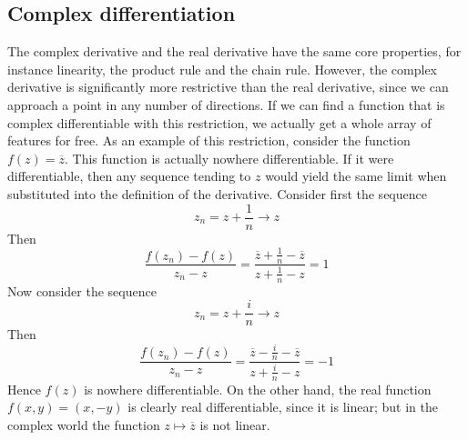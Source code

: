 \subsection{Complex differentiation}
The complex derivative and the real derivative have the same core properties, for instance linearity, the product rule and the chain rule.
However, the complex derivative is significantly more restrictive than the real derivative, since we can approach a point in any number of directions.
If we can find a function that is complex differentiable with this restriction, we actually get a whole array of features for free.
As an example of this restriction, consider the function \(f(z) = \overline{z}\).
This function is actually nowhere differentiable.
If it were differentiable, then any sequence tending to \(z\) would yield the same limit when substituted into the definition of the derivative.
Consider first the sequence
\[
	z_n = z + \frac{1}{n} \to z
\]
Then
\[
	\frac{f(z_n) - f(z)}{z_n - z} = \frac{\overline{z} + \frac{1}{n} - \overline{z}}{z + \frac{1}{n} - z} = 1
\]
Now consider the sequence
\[
	z_n = z + \frac{i}{n} \to z
\]
Then
\[
	\frac{f(z_n) - f(z)}{z_n - z} = \frac{\overline{z} - \frac{i}{n} - \overline{z}}{z + \frac{i}{n} - z} = -1
\]
Hence \(f(z)\) is nowhere differentiable.
On the other hand, the real function \(f(x, y) = (x, -y)\) is clearly real differentiable, since it is linear; but in the complex world the function \(z \mapsto \overline{z}\) is not linear.
